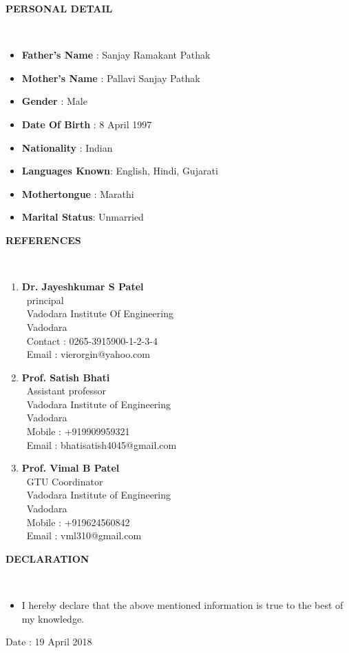 \documentclass[a4paper,10pt]{article}
\newcommand{\isep}{-2 pt}
\newcommand{\resheading}[1]{{\small \colorbox{mygrey}{\begin{minipage}{0.975\textwidth}{\textbf{#1 \vphantom{p\^{E}}}}\end{minipage}}}}
\begin{document}
 \resheading{\textbf{PERSONAL DETAIL}  }\\ [\isep]
  \begin{itemize}
      \item \textbf{Father's Name} : Sanjay Ramakant Pathak
      \item \textbf {Mother's Name} : Pallavi Sanjay Pathak
      \item \textbf {Gender}           : Male
      \item \textbf {Date Of Birth} : 8 April 1997 
      \item \textbf {Nationality}   : Indian
      \item \textbf {Languages Known}: English, Hindi, Gujarati
      \item \textbf {Mothertongue }  : Marathi
      \item \textbf {Marital Status}: Unmarried 
  \end{itemize}
  \resheading{\textbf{REFERENCES}  }\\ [\isep]
   \begin{enumerate}
       \item \textbf{Dr. Jayeshkumar S Patel}\\
       \ principal\\
       \ Vadodara Institute Of Engineering \\
       \ Vadodara \\
       \ Contact : 0265-3915900-1-2-3-4 \\
       \ Email : vierorgin@yahoo.com \\
       
       \item \textbf{Prof. Satish Bhati} \\
       \ Assistant professor \\
       \ Vadodara Institute of Engineering \\
       \ Vadodara \\
       \ Mobile : +919909959321 \\
       \ Email : bhatisatish4045@gmail.com \\
       
       \item \textbf{Prof. Vimal B Patel} \\
       \ GTU Coordinator \\
       \ Vadodara Institute of Engineering \\
       \ Vadodara \\
       \ Mobile : +919624560842 \\
       \ Email : vml310@gmail.com\\
   \end{enumerate}
 \resheading{\textbf{DECLARATION}  }\\ [\isep] 
 \begin{itemize}
     \item \noindent I hereby declare that the above mentioned information is true to the best of my knowledge.
 \end{itemize}
 
 \hspace{ 7.0 cm}
 \begin{itemize}
     
 \end{itemize}
 
 \raggedright{Date : 19 April 2018}\\ 
\end{document}
